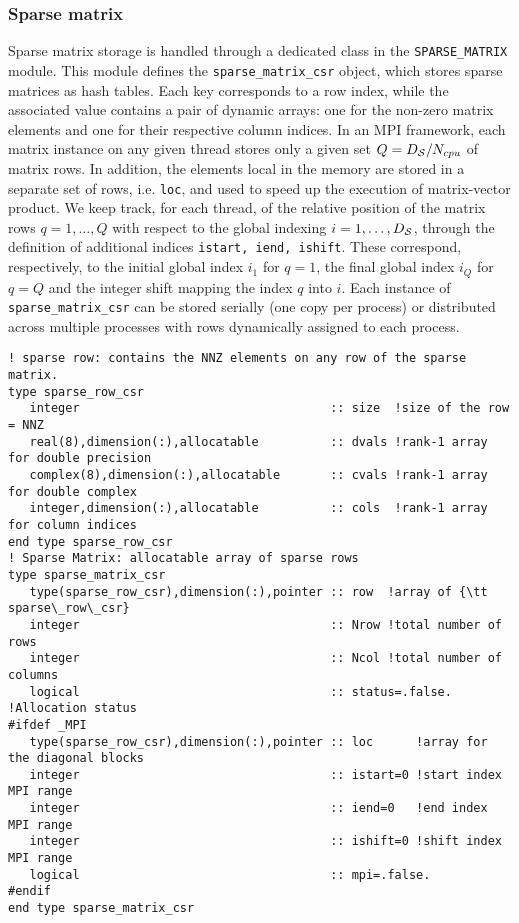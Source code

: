 \documentclass[edipack_sp.tex]{subfiles}
\begin{document}
\subsubsection{Sparse matrix}\label{CodeSparseMatrix}
Sparse matrix storage is handled through a dedicated class in the 
{\tt SPARSE\_MATRIX} module. This module defines the 
{\tt sparse\_matrix\_csr} object, which stores sparse matrices as 
hash tables. Each key corresponds to a row index, while the associated 
value contains a pair of dynamic arrays: one for the non-zero matrix 
elements and one for their respective column indices. 
In an MPI framework, each matrix instance on any given thread stores only a given set $Q=D_{\cal S}/N_{cpu}$ of matrix rows. In addition, the elements local in the memory are stored in a separate set of rows, i.e. {\tt loc}, and used to speed up the execution of matrix-vector product. 
We keep track, for each thread, of the relative position of the matrix rows $q=1,\dots,Q$ with respect to the global indexing $i=1,\dots,D_{\cal S}$, through the definition of additional indices {\tt istart, iend, ishift}. These correspond, respectively, to the initial global index $i_1$ for $q=1$, the final global index $i_Q$ for $q=Q$ and the integer shift mapping the index $q$ into $i$.    
Each instance of {\tt sparse\_matrix\_csr} can be stored serially (one copy per process) or distributed across multiple 
processes with rows dynamically assigned to each process. 

\begin{lstlisting}[style=fstyle,numbers=none]
! sparse row: contains the NNZ elements on any row of the sparse matrix.
type sparse_row_csr
   integer                                   :: size  !size of the row = NNZ
   real(8),dimension(:),allocatable          :: dvals !rank-1 array for double precision
   complex(8),dimension(:),allocatable       :: cvals !rank-1 array for double complex
   integer,dimension(:),allocatable          :: cols  !rank-1 array for column indices
end type sparse_row_csr
! Sparse Matrix: allocatable array of sparse rows
type sparse_matrix_csr
   type(sparse_row_csr),dimension(:),pointer :: row  !array of {\tt sparse\_row\_csr} 
   integer                                   :: Nrow !total number of rows
   integer                                   :: Ncol !total number of columns
   logical                                   :: status=.false. !Allocation status
#ifdef _MPI
   type(sparse_row_csr),dimension(:),pointer :: loc      !array for the diagonal blocks
   integer                                   :: istart=0 !start index MPI range
   integer                                   :: iend=0   !end index MPI range
   integer                                   :: ishift=0 !shift index MPI range
   logical                                   :: mpi=.false.
#endif
end type sparse_matrix_csr
\end{lstlisting}
\end{document}
